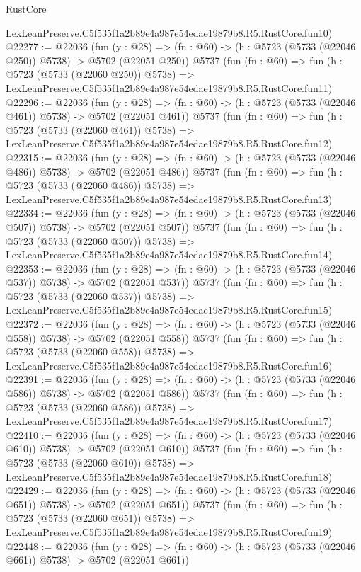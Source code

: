 \begin{lexlean}{RustCore}
\begin{coremodule}
    LexLeanPreserve.C5f535f1a2b89e4a987e54edae19879b8.R5.RustCore.fun10)
@22277 := @22036
    (fun (y : @28) => (fn : @60) -> (h : @5723 (@5733 (@22046 @250)) @5738) -> @5702 (@22051 @250))
    @5737
    (fun (fn : @60) =>
    fun (h : @5723 (@5733 (@22060 @250)) @5738) =>
    LexLeanPreserve.C5f535f1a2b89e4a987e54edae19879b8.R5.RustCore.fun11)
@22296 := @22036
    (fun (y : @28) => (fn : @60) -> (h : @5723 (@5733 (@22046 @461)) @5738) -> @5702 (@22051 @461))
    @5737
    (fun (fn : @60) =>
    fun (h : @5723 (@5733 (@22060 @461)) @5738) =>
    LexLeanPreserve.C5f535f1a2b89e4a987e54edae19879b8.R5.RustCore.fun12)
@22315 := @22036
    (fun (y : @28) => (fn : @60) -> (h : @5723 (@5733 (@22046 @486)) @5738) -> @5702 (@22051 @486))
    @5737
    (fun (fn : @60) =>
    fun (h : @5723 (@5733 (@22060 @486)) @5738) =>
    LexLeanPreserve.C5f535f1a2b89e4a987e54edae19879b8.R5.RustCore.fun13)
@22334 := @22036
    (fun (y : @28) => (fn : @60) -> (h : @5723 (@5733 (@22046 @507)) @5738) -> @5702 (@22051 @507))
    @5737
    (fun (fn : @60) =>
    fun (h : @5723 (@5733 (@22060 @507)) @5738) =>
    LexLeanPreserve.C5f535f1a2b89e4a987e54edae19879b8.R5.RustCore.fun14)
@22353 := @22036
    (fun (y : @28) => (fn : @60) -> (h : @5723 (@5733 (@22046 @537)) @5738) -> @5702 (@22051 @537))
    @5737
    (fun (fn : @60) =>
    fun (h : @5723 (@5733 (@22060 @537)) @5738) =>
    LexLeanPreserve.C5f535f1a2b89e4a987e54edae19879b8.R5.RustCore.fun15)
@22372 := @22036
    (fun (y : @28) => (fn : @60) -> (h : @5723 (@5733 (@22046 @558)) @5738) -> @5702 (@22051 @558))
    @5737
    (fun (fn : @60) =>
    fun (h : @5723 (@5733 (@22060 @558)) @5738) =>
    LexLeanPreserve.C5f535f1a2b89e4a987e54edae19879b8.R5.RustCore.fun16)
@22391 := @22036
    (fun (y : @28) => (fn : @60) -> (h : @5723 (@5733 (@22046 @586)) @5738) -> @5702 (@22051 @586))
    @5737
    (fun (fn : @60) =>
    fun (h : @5723 (@5733 (@22060 @586)) @5738) =>
    LexLeanPreserve.C5f535f1a2b89e4a987e54edae19879b8.R5.RustCore.fun17)
@22410 := @22036
    (fun (y : @28) => (fn : @60) -> (h : @5723 (@5733 (@22046 @610)) @5738) -> @5702 (@22051 @610))
    @5737
    (fun (fn : @60) =>
    fun (h : @5723 (@5733 (@22060 @610)) @5738) =>
    LexLeanPreserve.C5f535f1a2b89e4a987e54edae19879b8.R5.RustCore.fun18)
@22429 := @22036
    (fun (y : @28) => (fn : @60) -> (h : @5723 (@5733 (@22046 @651)) @5738) -> @5702 (@22051 @651))
    @5737
    (fun (fn : @60) =>
    fun (h : @5723 (@5733 (@22060 @651)) @5738) =>
    LexLeanPreserve.C5f535f1a2b89e4a987e54edae19879b8.R5.RustCore.fun19)
@22448 := @22036
    (fun (y : @28) => (fn : @60) -> (h : @5723 (@5733 (@22046 @661)) @5738) -> @5702 (@22051 @661))

\end{coremodule}
\end{lexlean}
